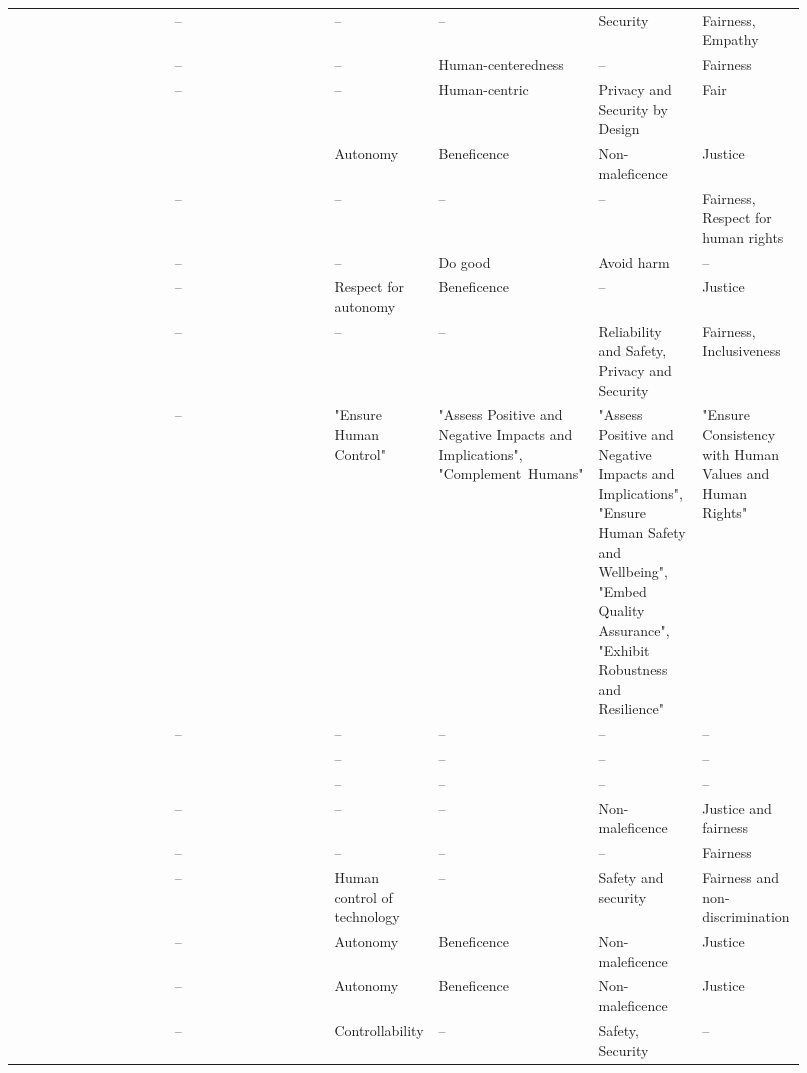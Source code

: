 \begin{landscape}
\begin{ThreePartTable}
\begin{longtable}{P{0.2\linewidth}P{0.2\linewidth}P{0.13\linewidth}P{0.13\linewidth}P{0.13\linewidth}P{0.13\linewidth}}
        \textcite{Anagnostou_2022} & -- & -- & -- & Security & Fairness, Empathy \\ 
        \textcite{BarredoArrieta_2020} & -- & -- & Human-centeredness & -- & Fairness \\ 
        \textcite{Benjamins_2019} & -- & -- & Human-centric & Privacy and Security by Design & Fair \\ 
        \textcite{Borda_2022} & \textcite{Floridi_2018} & Autonomy & Beneficence & Non-maleficence & Justice \\ 
        \textcite{Brand_2022} & -- & -- & -- & -- & Fairness, Respect for human rights \\ 
        \textcite{Buhmann_2021} & -- & -- & Do good & Avoid harm & -- \\ 
        \textcite{Canca_2020} & -- & Respect for autonomy & Beneficence & -- & Justice \\ 
        \textcite{Cheng_2021} & -- & -- & -- & Reliability and Safety, Privacy and Security & Fairness, Inclusiveness \\ 
        \textcite{Clarke_2019} & -- & "Ensure Human \mbox{Control}" & "Assess Positive and Negative Impacts and Implications", "\mbox{Complement Humans}" & "Assess Positive and Negative Impacts and Implications", "\mbox{Ensure} Human Safety and Wellbeing", "Embed Quality Assurance", "Exhibit Robustness and Resilience" & "\mbox{Ensure} Consistency with Human Values and Human Rights" \\ 
        \textcite{Dignum_2017} & -- & -- & -- & -- & -- \\ 
        \textcite{Dignum_2019} & \textcite{Dignum_2017} & -- & -- & -- & -- \\ 
        \textcite{Dignum_2021} & \textcite{Dignum_2017} & -- & -- & -- & -- \\ 
        \textcite{Doorn_2021} & -- & -- & -- & Non-maleficence & Justice and fairness \\ 
        \textcite{Eitel-Porter_2021} & -- & -- & -- & -- & Fairness \\ 
        \textcite{Fjeld_2020} & -- & Human control of \mbox{technology} & -- & Safety and security & Fairness and \mbox{non-discrimination} \\ 
        \textcite{Floridi_2018} & -- & Autonomy & Beneficence & Non-maleficence & Justice \\ 
        \textcite{Floridi_2019} & -- & Autonomy & Beneficence & Non-maleficence & Justice \\ 
        \textcite{Gianni_2022} & -- & Controllability & -- & Safety, Security & -- \\ 

\end{longtable}
\end{ThreePartTable}
\end{landscape}

